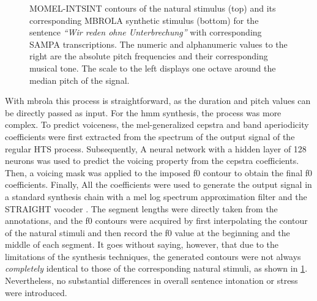 %
\begin{figure}[t]
	\centering
	\caption[MOMEL comparison of natural \acs{f0} contour imposition on a synthetic stimulus]
		{MOMEL-INTSINT contours of the natural stimulus (top) and its corresponding MBROLA synthetic stimulus (bottom) for the sentence \emph{\enquote{Wir reden ohne Unterbrechung}} with corresponding SAMPA transcriptions.
		The numeric and alphanumeric values to the right are the absolute pitch frequencies and their corresponding musical tone.
		The scale to the left displays one octave around the median pitch of the signal.}
	\label{fig:momel-comparison}
\end{figure}
%
With \ac{mbrola} this process is straightforward, as the duration and pitch values can be directly passed as input.
For the \ac{hmm} synthesis, the process was more complex.
To predict voiceness, the mel-generalized cepstra and band aperiodicity coefficients were first extracted from the spectrum of the output signal of the regular HTS process.
Subsequently, A neural network with a hidden layer of 128 neurons was used to predict the voicing property from the cepstra coefficients.
Then, a voicing mask was applied to the imposed \ac{f0} contour to obtain the final \ac{f0} coefficients.
Finally, All the coefficients were used to generate the output signal in a standard synthesis chain with a mel log spectrum approximation filter and the STRAIGHT vocoder \citep{Kawahara2006straight}.
The segment lengths were directly taken from the annotations, and the \ac{f0} contours were acquired by first interpolating the contour of the natural stimuli and then record the \ac{f0} value at the beginning and the middle of each segment.
It goes without saying, however, that due to the limitations of the synthesis techniques, the generated contours were not always \emph{completely} identical to those of the corresponding natural stimuli, as shown in \cref{fig:momel-comparison}.
Nevertheless, no substantial differences in overall sentence intonation or stress were introduced.

